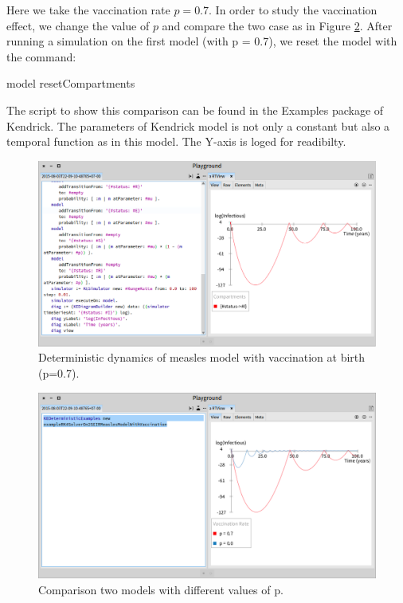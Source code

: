 \documentclass[a4paper,10pt,twoside]{book}
\begin{document}
Here we take the vaccination rate  $p=0.7$. In order to study the vaccination effect, we change the value of  $p$ and compare the two case as in Figure \ref{SEIR_vacc_RK4_2}.
After running a simulation on the first model (with p = 0.7), we reset the model with the command:

\begin{code}{}
model resetCompartments
\end{code}

The script to show this comparison can be found in the Examples package of Kendrick. The parameters of Kendrick model is not only a constant but also a temporal function as in this model. The Y-axis is loged for readibilty.


\begin{figure}

\begin{center}
\includegraphics[width=1.0\textwidth]{figures/SEIR_vacc_RK4.png}\caption{Deterministic dynamics of measles model with vaccination at birth (p=0.7).\label{figures/SEIR_vacc_RK4.png}}\end{center}
\end{figure}



\begin{figure}

\begin{center}
\includegraphics[width=1.0\textwidth]{figures/SEIR_vacc_RK4_2.png}\caption{Comparison two models with different values of p.\label{SEIR_vacc_RK4_2}}\end{center}
\end{figure}
\end{document}
